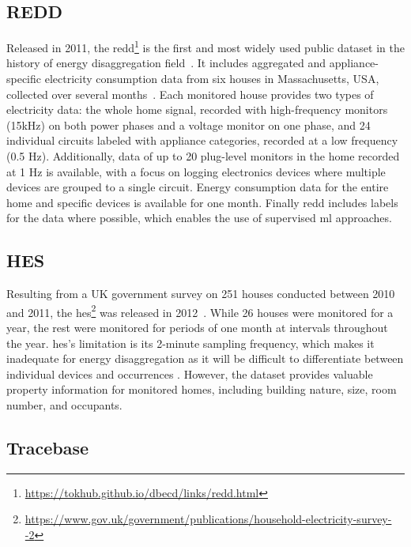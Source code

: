 \subsection{REDD}

Released in 2011, the \acrlong{redd}\footnote{\url{https://tokhub.github.io/dbecd/links/redd.html}} is the first and most widely used public dataset in the history of energy disaggregation field~\parencite{iqbalCriticalReviewStateoftheart2020}. It includes aggregated and appliance-specific electricity consumption data from six houses in Massachusetts, USA, collected over several months~\parencite{kolterREDDPublicData2011}. Each monitored house provides two types of electricity data: the whole home signal, recorded with high-frequency monitors (15kHz) on both power phases and a voltage monitor on one phase, and 24 individual circuits labeled with appliance categories, recorded at a low frequency (0.5 Hz). Additionally, data of up to 20 plug-level monitors in the home recorded at 1 Hz is available, with a focus on logging electronics devices where multiple devices are grouped to a single circuit. Energy consumption data for the entire home and specific devices is available for one month. Finally \acrshort{redd} includes labels for the data where possible, which enables the use of supervised \acrshort{ml} approaches.

\subsection{HES}

Resulting from a UK government survey on 251 houses conducted between 2010 and 2011, the \acrlong{hes}\footnote{\url{https://www.gov.uk/government/publications/household-electricity-survey--2}} was released in 2012~\parencite{zimmermannHouseholdElectricitySurvey2012}. While 26 houses were monitored for a year, the rest were monitored for periods of one month at intervals throughout the year. \acrshort{hes}'s limitation is its 2-minute sampling frequency, which makes it inadequate for energy disaggregation as it will be difficult to differentiate between individual devices and occurrences \parencite{himeurBuildingPowerConsumption2020}. However, the dataset provides valuable property information for monitored homes, including building nature, size, room number, and occupants.

\subsection{Tracebase}

